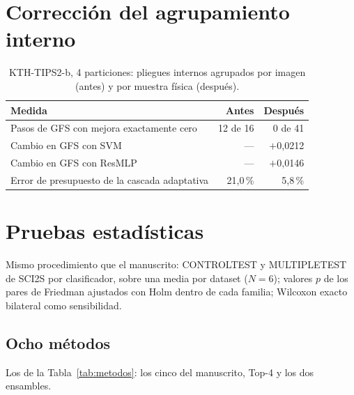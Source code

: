 \documentclass[11pt,a4paper]{article}
\newcommand{\pos}[1]{\textcolor{bien}{$+$#1}}
\begin{document}
\section{Corrección del agrupamiento interno}

\begin{table}[H]
\centering
\caption{KTH-TIPS2-b, 4 particiones: pliegues internos agrupados por imagen
(antes) y por muestra física (después).}
\begin{tabular}{@{}lrr@{}}
\toprule
Medida & Antes & Después \\
\midrule
Pasos de GFS con mejora exactamente cero & 12 de 16 & 0 de 41 \\
Cambio en GFS con SVM & --- & \pos{0,0212} \\
Cambio en GFS con ResMLP & --- & \pos{0,0146} \\
Error de presupuesto de la cascada adaptativa & 21,0\,\% & 5,8\,\% \\
\bottomrule
\end{tabular}
\end{table}

\clearpage
\section{Pruebas estadísticas}\label{sec:stats}

\noindent Mismo procedimiento que el manuscrito: CONTROLTEST y MULTIPLETEST de
SCI2S por clasificador, sobre una media por dataset ($N=6$); valores $p$ de los
pares de Friedman ajustados con Holm dentro de cada familia; Wilcoxon exacto
bilateral como sensibilidad.

\subsection{Ocho métodos}

\noindent Los de la Tabla~\ref{tab:metodos}: los cinco del manuscrito, Top-4 y
los dos ensambles.
\end{document}
